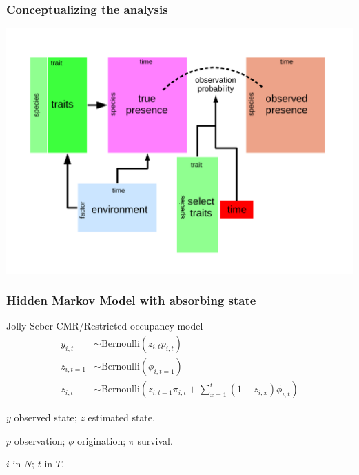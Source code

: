 \documentclass{beamer}
\begin{document}
\begin{frame}
  \frametitle{Conceptualizing the analysis}
  \begin{center}
    \includegraphics[width=\textwidth,height=\textheight,keepaspectratio=true]{figure/paleo_fourth_corner}
  \end{center}
\end{frame}


\begin{frame}
  \frametitle{Hidden Markov Model with absorbing state}
  \begin{block}{Jolly-Seber CMR/Restricted occupancy model}
    \begin{align*}
      y_{i, t} &\sim \text{Bernoulli}(z_{i, t} p_{i, t}) \\
      z_{i, t = 1} &\sim \text{Bernoulli}(\phi_{i, t = 1}) \\
      z_{i, t} &\sim \text{Bernoulli}\left(z_{i, t - 1} \pi_{i,t} + \sum_{x = 1}^{t}(1 - z_{i, x}) \phi_{i, t}\right)
    \end{align*}
    \begin{scriptsize}
      \(y\) observed state; \(z\) estimated state.

      \(p\) observation; \(\phi\) origination; \(\pi\) survival.

      \(i\) in \(N\); \(t\) in \(T\).
    \end{scriptsize}
  \end{block}
\end{frame}
\end{document}
